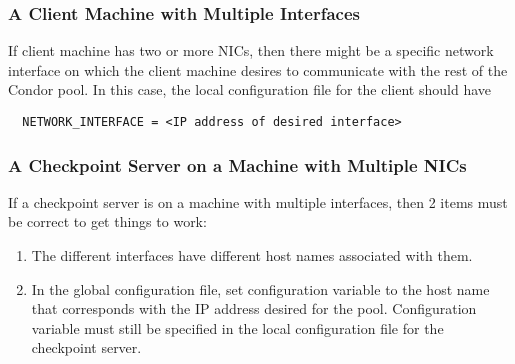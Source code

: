\subsubsection{A Client Machine with Multiple Interfaces}

If client machine has two or more NICs, then there might be
a specific network interface on which the client machine desires to
communicate with the rest of the Condor pool. 
In this case, the local configuration file for the client should have
\begin{verbatim}
  NETWORK_INTERFACE = <IP address of desired interface>
\end{verbatim}

\subsubsection{A Checkpoint Server on a Machine with Multiple NICs}

If a checkpoint server is on a machine with multiple interfaces,
then 2 items must be correct to get things to work:
\begin{enumerate}
\item
The different interfaces have different host names associated with them.
\item
In the global configuration file,
set configuration variable  to the host name
that corresponds with the IP address desired for the pool.
Configuration variable  must still be specified
in the local configuration file for the checkpoint server.
\end{enumerate}

